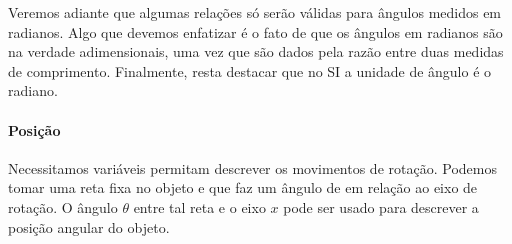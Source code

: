 Veremos adiante que algumas relações só serão válidas para ângulos medidos em radianos. Algo que devemos enfatizar é o fato de que os ângulos em radianos são na verdade adimensionais, uma vez que são dados pela razão entre duas medidas de comprimento. Finalmente, resta destacar que no SI a unidade de ângulo é o radiano.


\paragraph{Posição}

Necessitamos variáveis permitam descrever os movimentos de rotação. Podemos tomar uma reta fixa no objeto e que faz um ângulo de  em relação ao eixo de rotação. O ângulo $\theta$ entre tal reta e o eixo $x$ pode ser usado para descrever a posição angular do objeto.


